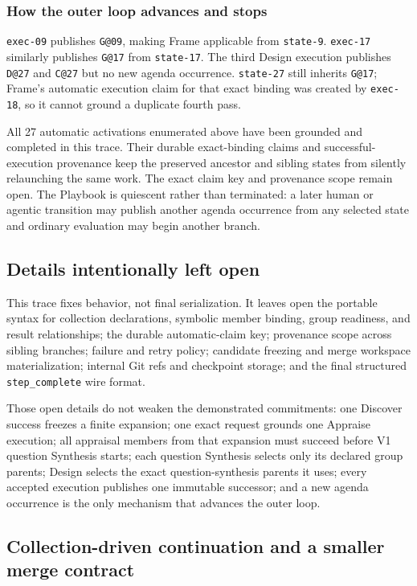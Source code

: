 \documentclass[11pt]{article}
\begin{document}
\subsubsection{How the outer loop advances and stops}

\texttt{exec-09} publishes \texttt{G@09}, making Frame applicable from
\texttt{state-9}. \texttt{exec-17} similarly publishes \texttt{G@17} from
\texttt{state-17}. The third Design execution publishes \texttt{D@27} and
\texttt{C@27} but no new agenda occurrence. \texttt{state-27} still inherits
\texttt{G@17}; Frame's automatic execution claim for that exact binding was
created by \texttt{exec-18}, so it cannot ground a duplicate fourth pass.

All 27 automatic activations enumerated above have been grounded and completed
in this trace. Their durable exact-binding claims and successful-execution
provenance keep the preserved ancestor and sibling states from silently
relaunching the same work. The exact claim key and provenance scope remain
open. The Playbook is
quiescent rather than terminated: a later human or agentic transition may
publish another agenda occurrence from any selected state and ordinary
evaluation may begin another branch.

\subsection{Details intentionally left open}

This trace fixes behavior, not final serialization. It leaves open the portable
syntax for collection declarations, symbolic member binding, group readiness,
and result relationships; the durable automatic-claim key; provenance scope
across sibling branches; failure and retry policy; candidate freezing and merge
workspace materialization; internal Git refs and checkpoint storage; and the
final structured \texttt{step\_complete} wire format.

Those open details do not weaken the demonstrated commitments: one Discover
success freezes a finite expansion; one exact request grounds one Appraise
execution; all appraisal members from that expansion must succeed before V1
question Synthesis starts; each question Synthesis selects only its declared
group parents; Design selects the exact question-synthesis parents it uses;
every accepted execution publishes one immutable successor; and a new agenda
occurrence is the only mechanism that advances the outer loop.

\Needspace{5.2in}
\subsection{Collection-driven continuation and a smaller merge contract}
\end{document}
